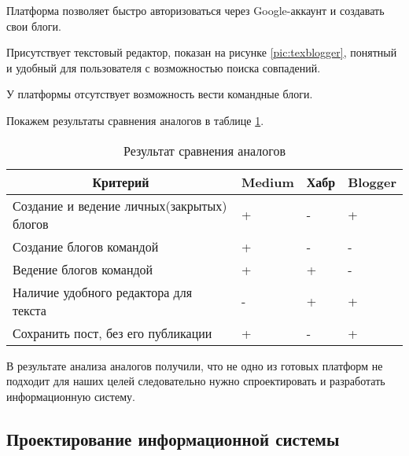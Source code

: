 Платформа позволяет быстро авторизоваться через Google-аккаунт и создавать свои блоги.

Присутствует текстовый редактор, показан на рисунке \ref{pic:texblogger}, понятный и удобный для пользователя с возможностью поиска совпадений.


У платформы отсутствует возможность вести командные блоги.

Покажем результаты сравнения аналогов в таблице \ref{tabular:analogi}.

\begin{table}[H]
	\caption{Результат сравнения аналогов}
	\label{tabular:analogi}
	\begin{center}
		\begin{tabular}{|l|l|l|l|}
			\hline
			\multicolumn{1}{|c|}{Критерий}             & \multicolumn{1}{c|}{Medium} & \multicolumn{1}{c|}{Хабр} & \multicolumn{1}{c|}{Blogger} \\ \hline
			Создание и ведение личных(закрытых) блогов & +                           & -                         & +                            \\ \hline
			Создание блогов командой                   & +                           & -                         & -                            \\ \hline
			Ведение блогов командой                    & +                           & +                         & -                            \\ \hline
			Наличие удобного редактора для текста      & -                           & +                         & +                            \\ \hline
			Сохранить пост, без его публикации         & +                           & -                         & +                            \\ \hline
		\end{tabular}
	\end{center}
\end{table}
В результате анализа аналогов получили, что не одно из готовых платформ не подходит для наших целей следовательно нужно спроектировать и разработать информационную систему.

\subsection{Проектирование информационной системы}


\pagebreak